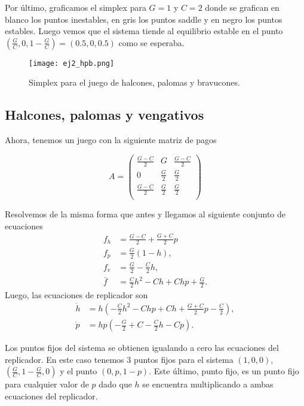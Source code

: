\documentclass[letterpaper,12pt]{article}
\theoremstyle{plain}
\begin{document}
Por último, graficamos el simplex para $G = 1$ y $C = 2$ donde se grafican en blanco los puntos inestables, en gris los puntos saddle y en negro los puntos estables. Luego vemos que el sistema tiende al equilibrio estable en el punto $(\frac{G}{C},0,1-\frac{G}{C}) = (0.5,0,0.5)$ como se esperaba.

\begin{figure}[h]
    \centering
    \texttt{[image: ej2\_hpb.png]}
    \caption{Simplex para el juego de halcones, palomas y bravucones.} 
    \label{fig:ej2_hpb}
\end{figure}

\subsection*{Halcones, palomas y vengativos}

Ahora, tenemos un juego con la siguiente matriz de pagos

\begin{equation*}
    A =
\begin{pmatrix}
\frac{G-C}{2} & G & \frac{G-C}{2} \\[6pt]
0 & \frac{G}{2} & \frac{G}{2} \\[6pt]
\frac{G-C}{2} & \frac{G}{2} & \frac{G}{2} \\
\end{pmatrix}
\end{equation*}

Resolvemos de la misma forma que antes y llegamos al siguiente conjunto de ecuaciones
\begin{align}
    f_h &= \frac{G-C}{2}+\frac{G+C}{2}p \\
    f_p &= \frac{G}{2}(1-h), \\
    f_v &= \frac{G}{2}-\frac{C}{2}h, \\
    \bar{f} &= \frac{C}{2}h^2-Ch+Chp+\frac{G}{2}.
\end{align}
Luego, las ecuaciones de replicador son  
\begin{align}
    \dot{h} &= h\left(-\frac{C}{2}h^2-Chp+Ch+\frac{G+C}{2}p-\frac{C}{2} \right), \\
    \dot{p} &= hp\left(-\frac{G}{2}+C-\frac{C}{2}h-Cp \right).
\end{align}

Los puntos fijos del sistema se obtienen igualando a cero las ecuaciones del replicador. En este caso tenemos 3 puntos fijos para el sistema $(1,0,0)$, $(\frac{G}{C},1 - \frac{G}{C},0)$ y el punto $(0,p,1-p)$. Este último, punto fijo, es un punto fijo para cualquier valor de $p$ dado que $h$ se encuentra multiplicando a ambas ecuaciones del replicador.
\end{document}
